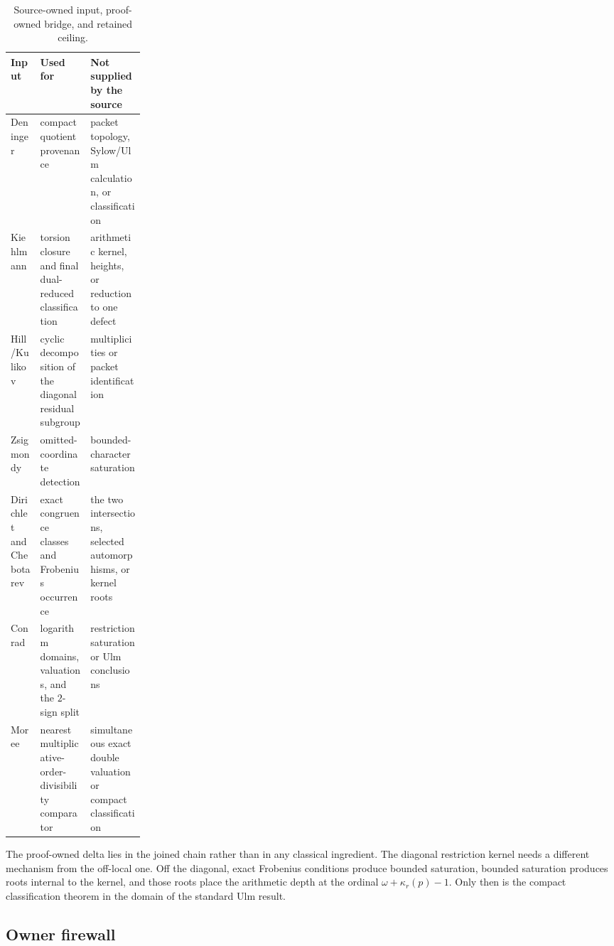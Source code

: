 \documentclass[11pt]{article}
\theoremstyle{definition}
\begin{document}
\begin{table}[htbp]
\centering\small
\caption{Source-owned input, proof-owned bridge, and retained ceiling.}
\label{tab:source-ceilings}
\begin{tabularx}{\linewidth}{P{0.22\linewidth}YY}
\toprule
Input & Used for & Not supplied by the source \\
\midrule
Deninger \citep{Deninger2020} & compact quotient provenance & packet topology, Sylow/Ulm calculation, or classification \\
Kiehlmann \citep{Kiehlmann2013} & torsion closure and final dual-reduced classification & arithmetic kernel, heights, or reduction to one defect \\
Hill/Kulikov \citep{Hill1972} & cyclic decomposition of the diagonal residual subgroup & multiplicities or packet identification \\
Zsigmondy \citep{Zsigmondy1892} & omitted-coordinate detection & bounded-character saturation \\
Dirichlet and Chebotarev \citep{Sutherland2021Dirichlet,Sutherland2021Chebotarev,LagariasOdlyzko1977} & exact congruence classes and Frobenius occurrence & the two intersections, selected automorphisms, or kernel roots \\
Conrad \citep{ConradInfiniteSeries,ConradPadicInterpolation} & logarithm domains, valuations, and the $2$-sign split & restriction saturation or Ulm conclusions \\
Moree \citep{Moree2005} & nearest multiplicative-order-divisibility comparator & simultaneous exact double valuation or compact classification \\
\bottomrule
\end{tabularx}
\end{table}

The proof-owned delta lies in the joined chain rather than in any classical
ingredient.  The diagonal restriction kernel needs a different mechanism
from the off-local one.  Off the diagonal, exact Frobenius conditions produce
bounded saturation, bounded saturation produces roots internal to the
kernel, and those roots place the arithmetic depth at the ordinal
$\omega+\kappa_r(p)-1$.  Only then is the compact classification theorem in
the domain of the standard Ulm result.

\subsection{Owner firewall}
\end{document}
